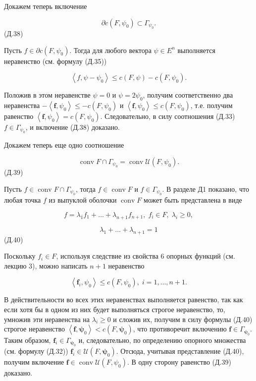 \documentclass[8pt]{extarticle}
\begin{document}
Докажем теперь включение

\[
\partial c\left( {F,{\psi }_{0}}\right)  \subset  {\Gamma }_{{\psi }_{0}}.
\]
 (Д.38)

Пусть \(f \in  \partial c\left( {F,{\psi }_{0}}\right)\). Тогда для любого вектора \(\psi  \in  {E}^{n}\) выполняется неравенство (см. формулу (Д.35))

\[
\left\langle  {f,\psi  - {\psi }_{0}}\right\rangle   \leq  c\left( {F,\psi }\right)  - c\left( {F,{\psi }_{0}}\right) .
\]

Положив в этом неравенстве \(\psi  = 0\) и \(\psi  = 2{\psi }_{0}\), получим соответственно два неравенства \(-\left\langle  {\mathbf{f},{\psi }_{0}}\right\rangle   \leq   - c\left( {F,{\psi }_{0}}\right)\) и \(\left\langle  {\mathbf{f},{\psi }_{0}}\right\rangle   \leq  c\left( {F,{\psi }_{0}}\right)\), т.е. получим равенство \(\left\langle  {\mathbf{f},{\psi }_{0}}\right\rangle   = c\left( {F,{\psi }_{0}}\right)\). Следовательно, в силу соотношения (Д.33) \(f \in  {\Gamma }_{{\psi }_{0}}\), и включение (Д.38) доказано.

Докажем теперь еще одно соотношение

\[
\operatorname{conv}F \cap  {\Gamma }_{{\psi }_{0}} = \operatorname{conv}\mathcal{U}\left( {F,{\psi }_{0}}\right) .
\]
 (Д.39)

Пусть \(f \in  \operatorname{conv}F \cap  {\Gamma }_{{\psi }_{0}}\), тогда \(f \in  \operatorname{conv}F\) и \(f \in  {\Gamma }_{{\psi }_{0}}\). В разделе Д1 показано, что любая точка \(f\) из выпуклой оболочки \(\operatorname{conv}F\) может быть представлена в виде

\[
f = {\lambda }_{1}{f}_{1} + \ldots  + {\lambda }_{n + 1}{f}_{n + 1},\;{f}_{i} \in  F,\;{\lambda }_{i} \geq  0,
\]

\[
{\lambda }_{1} + \ldots  + {\lambda }_{n + 1} = 1
\]
 (Д.40)

Поскольку \({f}_{i} \in  F\), используя следствие из свойства 6 опорных функций (см. лекцию 3), можно написать \(n + 1\) неравенство

\[
\left\langle  {{\mathbf{f}}_{i},{\psi }_{0}}\right\rangle   \leq  c\left( {F,{\psi }_{0}}\right) ,\;i = 1,\ldots ,n + 1.
\]

В действительности во всех этих неравенствах выполняется равенство, так как если хотя бы в одном из них будет выполняться строгое неравенство, то, умножив эти неравенства на \({\lambda }_{i} \geq  0\) и сложив их, получим в силу формулы (Д.40) строгое неравенство \(\left\langle  {\mathbf{f},{\mathbf{\psi }}_{0}}\right\rangle   < c\left( {F,{\mathbf{\psi }}_{0}}\right)\), что противоречит включению \(\mathbf{f} \in  {\Gamma }_{{\mathbf{\psi }}_{0}}\). Таким образом, \({\mathbf{f}}_{i} \in  {\Gamma }_{{\mathbf{\psi }}_{0}}\) и, следовательно, по определению опорного множества (см. формулу (Д.32)) \({\mathbf{f}}_{i} \in  \mathcal{U}\left( {F,{\mathbf{\psi }}_{0}}\right)\). Отсюда, учитывая представление (Д.40), получим включение \(\mathbf{f} \in  \operatorname{conv}\mathcal{U}\left( {F,{\psi }_{0}}\right)\). В одну сторону равенство (Д.39) доказано.
\end{document}
